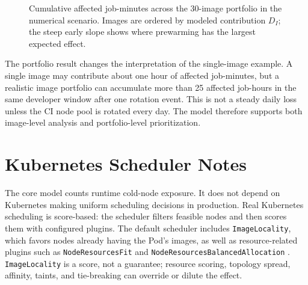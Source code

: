 \documentclass[11pt,a4paper]{article}
\begin{document}
\begin{figure}[H]
\centering
{}
\caption{Cumulative affected job-minutes across the 30-image portfolio in the numerical scenario. Images are ordered by modeled contribution \(D_I\); the steep early slope shows where prewarming has the largest expected effect.}
\label{fig:multiimagecumulative}
\end{figure}

The portfolio result changes the interpretation of the single-image example. A single image may contribute about one hour of affected job-minutes, but a realistic image portfolio can accumulate more than 25 affected job-hours in the same developer window after one rotation event. This is not a steady daily loss unless the CI node pool is rotated every day. The model therefore supports both image-level analysis and portfolio-level prioritization.

\section{Kubernetes Scheduler Notes}\label{sec:scheduler-notes}

The core model counts runtime cold-node exposure. It does not depend on Kubernetes making uniform scheduling decisions in production. Real Kubernetes scheduling is score-based: the scheduler filters feasible nodes and then scores them with configured plugins. The default scheduler includes \texttt{ImageLocality}, which favors nodes already having the Pod's images, as well as resource-related plugins such as \texttt{NodeResourcesFit} and \texttt{NodeResourcesBalancedAllocation} \cite{schedulerconfig}. \texttt{ImageLocality} is a score, not a guarantee; resource scoring, topology spread, affinity, taints, and tie-breaking can override or dilute the effect.
\end{document}
